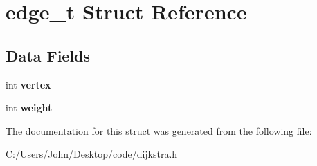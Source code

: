 \hypertarget{structedge__t}{}\section{edge\+\_\+t Struct Reference}
\label{structedge__t}
\subsection*{Data Fields}
\begin{DoxyCompactItemize}
\item 
\mbox{\label{structedge__t_a7b6a73a9ea2850e455702ad082701c9d}} 
int {\bfseries vertex}
\item 
\mbox{\label{structedge__t_aa01147b1f07072d246c76dc85d69df7c}} 
int {\bfseries weight}
\end{DoxyCompactItemize}


The documentation for this struct was generated from the following file\+:\begin{DoxyCompactItemize}
\item 
C\+:/\+Users/\+John/\+Desktop/code/dijkstra.\+h\end{DoxyCompactItemize}
